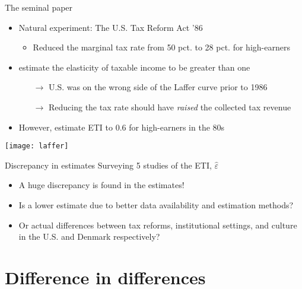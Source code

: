 \documentclass[8pt]{beamer}
\begin{document}
\begin{frame}{The seminal paper}
  \begin{itemize}
    \item Natural experiment: The U.S. Tax Reform Act '86
    \begin{itemize}
      \item Reduced the marginal tax rate from 50 pct. to 28 pct. for high-earners
    \end{itemize}
    \item \citet{feldstein1995effect} estimate the elasticity of taxable income to be greater than one
    \begin{itemize}
      \item[$\rightarrow$] U.S. was on the wrong side of the Laffer curve prior to 1986
      \item[$\rightarrow$] Reducing the tax rate should have \textit{raised} the collected tax revenue
    \end{itemize}
    \item However, \citet{gruber2002elasticity} estimate ETI to 0.6 for high-earners in the 80s
  \end{itemize}
    \centering\texttt{[image: laffer]}
\end{frame}

\begin{frame}{Discrepancy in estimates}
  Surveying 5 studies of the ETI, $\hat{\varepsilon}$
  \begin{itemize}
    \item A huge discrepancy is found in the estimates!
    \item Is a lower estimate due to better data availability and estimation methods?
    \item Or actual differences between tax reforms, institutional settings, and culture in the U.S. and Denmark respectively?
  \end{itemize}
    \begin{table}[h]
      \centering
      \footnotesize
        
    \end{table}
\end{frame}


\section{Difference in differences}
\end{document}
